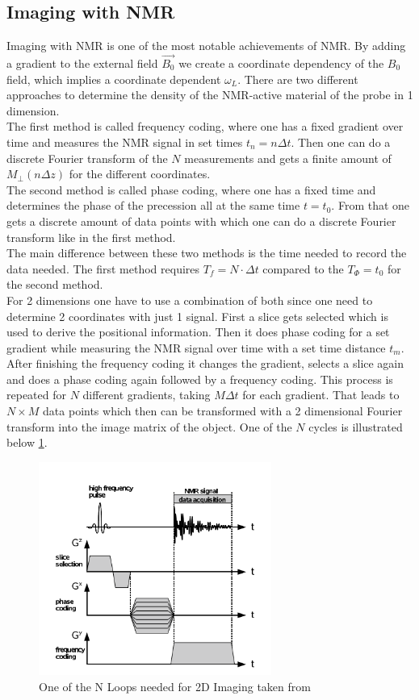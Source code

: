 \subsection{Imaging with NMR}\label{imagening}
Imaging with NMR is one of the most notable achievements of NMR. By adding a gradient to the external field $\vec{B_0}$ we create a coordinate dependency of the $B_0$ field, which implies a coordinate dependent $\omega_L$. There are two different approaches to determine the density of the NMR-active material of the probe in 1 dimension.
\vspace{2mm}\\
The first method is called frequency coding, where one has a fixed gradient over time and measures the  NMR signal in set times $t_n = n \Delta t$. Then one can do a discrete Fourier transform of the $N$ measurements and gets a finite amount of $M_{\perp}(n \Delta z)$ for the different coordinates. 
\vspace{2mm}\\
The second method is called phase coding, where one has a fixed time and determines the phase of the precession all at the same time $t = t_0$. From that one gets a discrete amount of data points with which one can do a discrete Fourier transform like in the first method. 
\vspace{2mm}\\
The main difference between these two methods is the time needed to record the data needed. The first method requires $T_f = N \cdot \Delta t$ compared to the $T_{\Phi} = t_0$ for the second method.
\vspace{3mm}\\
For 2 dimensions one have to use a combination of both since one need to determine 2 coordinates with just 1 signal. First a slice gets selected which is used to derive the positional information. Then it does phase coding for a set gradient while measuring the NMR signal over time with a set time distance $t_m$. After finishing the frequency coding it changes the gradient, selects a slice again and does a phase coding again followed by a frequency coding. This process is repeated for $N$ different gradients, taking $M \Delta t$ for each gradient. That leads to $N \times M$ data points which then can be transformed with a 2 dimensional Fourier transform into the image matrix of the object. One of the $N$ cycles is illustrated below \ref{2dfourier}.\\
\begin{figure}[h]
	\centering
	\includegraphics[width=0.63\linewidth ,height=7cm]{images/2d_fourier.png}
	\caption{One of the N Loops needed for 2D Imaging taken from \cite{manual}}
	\label{2dfourier}
\end{figure}